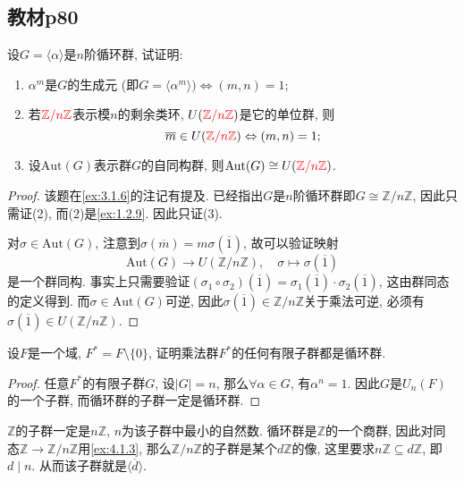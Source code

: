\subsection{教材p80}

\begin{problem}\label{ex:4.3.1}
    设$G = \langle \alpha \rangle$是$n$阶循环群, 试证明: 
    \begin{enumerate}[(1)]
        \item $\alpha^m$是$G$的生成元 (即$G = \langle \alpha^m \rangle ) \Leftrightarrow (m, n) = 1$;
        \item 若$\textcolor{red}{\mathbb{Z}/n\mathbb{Z}}$表示模$n$的剩余类环, $U(\textcolor{red}{\mathbb{Z}/n\mathbb{Z}})$是它的单位群, 则
        \[
            \overline{m} \in U(\textcolor{red}{\mathbb{Z}/n\mathbb{Z}}) \Leftrightarrow (m, n)=1;
        \]
        \item 设$\mathrm{Aut}(G)$表示群$G$的自同构群, 则$\mathrm{Aut}(G) \cong U(\textcolor{red}{\mathbb{Z}/n\mathbb{Z}})$.
    \end{enumerate}
\end{problem}

\begin{proof}
    该题在\ref{ex:3.1.6}的注记有提及. 已经指出$G$是$n$阶循环群即$G \cong \mathbb{Z}/n\mathbb{Z}$, 因此只需证(2), 而(2)是\ref{ex:1.2.9}. 因此只证(3).

    对$\sigma \in \mathrm{Aut}(G)$, 注意到$\sigma(\overline{m}) = m\sigma(\overline{1})$, 故可以验证映射
    \[
        \mathrm{Aut}(G) \to U(\mathbb{Z}/n\mathbb{Z}),\quad \sigma \mapsto \sigma(\overline{1})
    \]
    是一个群同构. 事实上只需要验证$(\sigma_1 \circ \sigma_2)(\overline{1}) = \sigma_1(\overline{1})\cdot \sigma_2(\overline{1})$, 这由群同态的定义得到. 而$\sigma \in \mathrm{Aut}(G)$可逆, 因此$\sigma(\overline{1}) \in \mathbb{Z}/n\mathbb{Z}$关于乘法可逆, 必须有$\sigma(\overline{1}) \in U(\mathbb{Z}/n\mathbb{Z})$.
\end{proof}

\begin{problem}
    设$F$是一个域, $F^* = F \setminus \{0\}$, 证明乘法群$F^*$的任何有限子群都是循环群.
\end{problem}

\begin{proof}
    任意$F^*$的有限子群$G$, 设$|G| = n$, 那么$\forall \alpha \in G$, 有$\alpha^n = 1$. 因此$G$是$U_n(F)$的一个子群, 而循环群的子群一定是循环群.
\end{proof}

\begin{remark}
    $\mathbb{Z}$的子群一定是$n\mathbb{Z}$, $n$为该子群中最小的自然数. 循环群是$\mathbb{Z}$的一个商群, 因此对同态$\mathbb{Z} \to \mathbb{Z}/n\mathbb{Z}$用\ref{ex:4.1.3}, 那么$\mathbb{Z}/n\mathbb{Z}$的子群是某个$d\mathbb{Z}$的像, 这里要求$n\mathbb{Z} \subseteq d\mathbb{Z}$, 即$d \mid n$. 从而该子群就是$\langle \overline{d} \rangle$.
\end{remark}


